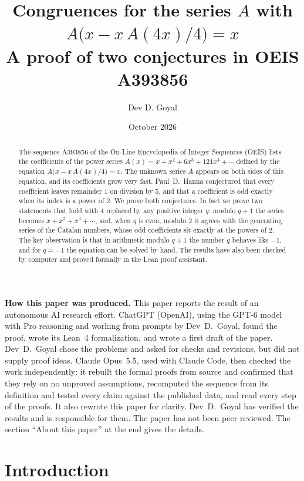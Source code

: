 \documentclass[11pt,a4paper]{article}
\title{Congruences for the series $A$ with $A\bigl(x-x\,A(4x)/4\bigr)=x$\\[6pt]\large A proof of two conjectures in OEIS A393856}
\author{Dev D. Goyal}
\date{October 2026}
\theoremstyle{definition}
\theoremstyle{remark}
\begin{document}
\maketitle
\begin{abstract}
The sequence A393856 of the On-Line Encyclopedia of Integer Sequences (OEIS) lists the coefficients of the power
series $A(x)=x+x^2+6x^3+121x^4+\cdots$ defined by the equation
$A\bigl(x-x\,A(4x)/4\bigr)=x$. The unknown series $A$ appears on both sides of this equation, and its coefficients grow very fast.
Paul~D.~Hanna conjectured that every coefficient leaves remainder $1$ on division by $5$, and that a coefficient is odd exactly when its index is a power of $2$. We prove both conjectures. In fact we prove two statements that hold with $4$ replaced by any positive integer $q$: modulo $q+1$ the series becomes $x+x^2+x^3+\cdots$, and, when $q$ is even, modulo $2$ it agrees with the generating series of the Catalan numbers, whose odd coefficients sit exactly at the powers of $2$. The key observation is that in arithmetic modulo $q+1$ the number $q$ behaves like $-1$, and
for $q=-1$ the equation can be solved by hand. The results have also been checked by computer and proved formally in the
Lean proof assistant.
\end{abstract}
\begin{center}\begin{minipage}{0.88\linewidth}\small
\textbf{How this paper was produced.} This paper reports the result of an autonomous AI research effort.
ChatGPT (OpenAI), using the GPT-6 model with Pro reasoning and working from prompts by Dev~D.~Goyal, found the proof, wrote its Lean~4 formalization, and wrote a first draft of the paper.
Dev~D.~Goyal chose the problems and asked for checks and revisions, but did not supply proof ideas.
Claude Opus~5.5, used with Claude Code, then checked the work independently: it rebuilt the formal proofs from
source and confirmed that they rely on no unproved assumptions, recomputed the sequence from its definition and tested
every claim against the published data, and read every step of the proofs. It also rewrote this paper for clarity.
Dev~D.~Goyal has verified the results and is responsible for them. The paper has not been peer reviewed.
The section ``About this paper'' at the end gives the details.
\end{minipage}\end{center}

\section{Introduction}
\end{document}
